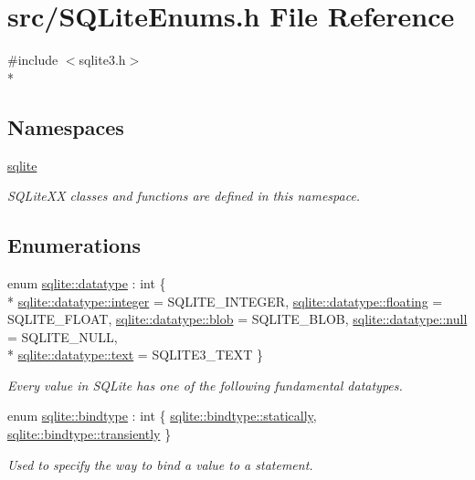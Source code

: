 \hypertarget{a00029}{\section{src/\-S\-Q\-Lite\-Enums.h File Reference}
\label{a00029}
}
{\ttfamily \#include $<$sqlite3.\-h$>$}\\*
\subsection*{Namespaces}
\begin{DoxyCompactItemize}
\item 
\hyperlink{a00038}{sqlite}
\begin{DoxyCompactList}\small\item\em S\-Q\-Lite\-X\-X classes and functions are defined in this namespace. \end{DoxyCompactList}\end{DoxyCompactItemize}
\subsection*{Enumerations}
\begin{DoxyCompactItemize}
\item 
enum \hyperlink{a00038_a7467e5cdd32bbf7fce35aced88682dc0}{sqlite\-::datatype} \-: int \{ \\*
\hyperlink{a00038_a7467e5cdd32bbf7fce35aced88682dc0a157db7df530023575515d366c9b672e8}{sqlite\-::datatype\-::integer} = S\-Q\-L\-I\-T\-E\-\_\-\-I\-N\-T\-E\-G\-E\-R, 
\hyperlink{a00038_a7467e5cdd32bbf7fce35aced88682dc0a374515b23d6f106696387776a6077d17}{sqlite\-::datatype\-::floating} = S\-Q\-L\-I\-T\-E\-\_\-\-F\-L\-O\-A\-T, 
\hyperlink{a00038_a7467e5cdd32bbf7fce35aced88682dc0aee26908bf9629eeb4b37dac350f4754a}{sqlite\-::datatype\-::blob} = S\-Q\-L\-I\-T\-E\-\_\-\-B\-L\-O\-B, 
\hyperlink{a00038_a7467e5cdd32bbf7fce35aced88682dc0a37a6259cc0c1dae299a7866489dff0bd}{sqlite\-::datatype\-::null} = S\-Q\-L\-I\-T\-E\-\_\-\-N\-U\-L\-L, 
\\*
\hyperlink{a00038_a7467e5cdd32bbf7fce35aced88682dc0a1cb251ec0d568de6a929b520c4aed8d1}{sqlite\-::datatype\-::text} = S\-Q\-L\-I\-T\-E3\-\_\-\-T\-E\-X\-T
 \}
\begin{DoxyCompactList}\small\item\em Every value in S\-Q\-Lite has one of the following fundamental datatypes. \end{DoxyCompactList}\item 
enum \hyperlink{a00038_ae6a0fc429d821cca9a1b01d36cb0991d}{sqlite\-::bindtype} \-: int \{ \hyperlink{a00038_ae6a0fc429d821cca9a1b01d36cb0991da29adf7ed88000fbb825808cb1d3667fa}{sqlite\-::bindtype\-::statically}, 
\hyperlink{a00038_ae6a0fc429d821cca9a1b01d36cb0991dad51ecd4c7c8454ddc870989523c01d4b}{sqlite\-::bindtype\-::transiently}
 \}
\begin{DoxyCompactList}\small\item\em Used to specify the way to bind a value to a statement. \end{DoxyCompactList}\end{DoxyCompactItemize}
